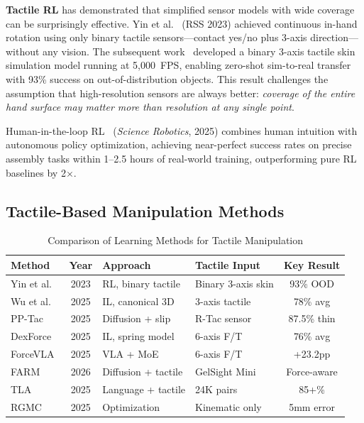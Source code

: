 \textbf{Tactile RL} has demonstrated that simplified sensor models with wide coverage can be surprisingly effective. Yin et al.~\cite{yin2023rotating} (RSS 2023) achieved continuous in-hand rotation using only binary tactile sensors---contact yes/no plus 3-axis direction---without any vision. The subsequent work~\cite{yin2024tactile} developed a binary 3-axis tactile skin simulation model running at 5{,}000~FPS, enabling zero-shot sim-to-real transfer with 93\% success on out-of-distribution objects. This result challenges the assumption that high-resolution sensors are always better: \emph{coverage of the entire hand surface may matter more than resolution at any single point}.

Human-in-the-loop RL~\cite{luo2025hil} (\emph{Science Robotics}, 2025) combines human intuition with autonomous policy optimization, achieving near-perfect success rates on precise assembly tasks within 1--2.5 hours of real-world training, outperforming pure RL baselines by 2$\times$.

\subsection{Tactile-Based Manipulation Methods}

\begin{table}[t]
\caption{Comparison of Learning Methods for Tactile Manipulation}
\label{tab:learning}
\centering
\begin{tabular}{@{}L{2.8cm}cL{2.8cm}L{2.5cm}c@{}}
\toprule
\textbf{Method} & \textbf{Year} & \textbf{Approach} & \textbf{Tactile Input} & \textbf{Key Result} \\
\midrule
Yin et al.~\cite{yin2023rotating} & 2023 & RL, binary tactile & Binary 3-axis skin & 93\% OOD \\
Wu et al.~\cite{wu2025canonical} & 2025 & IL, canonical 3D & 3-axis tactile & 78\% avg \\
PP-Tac~\cite{lin2025pptac} & 2025 & Diffusion + slip & R-Tac sensor & 87.5\% thin \\
DexForce~\cite{chen2025dexforce} & 2025 & IL, spring model & 6-axis F/T & 76\% avg \\
ForceVLA~\cite{yu2025forcevla} & 2025 & VLA + MoE & 6-axis F/T & +23.2pp \\
FARM~\cite{helmut2025farm} & 2026 & Diffusion + tactile & GelSight Mini & Force-aware \\
TLA~\cite{hao2025tla} & 2025 & Language + tactile & 24K pairs & 85+\% \\
RGMC~\cite{yu2025rgmc} & 2025 & Optimization & Kinematic only & 5mm error \\
\bottomrule
\end{tabular}
\end{table}

